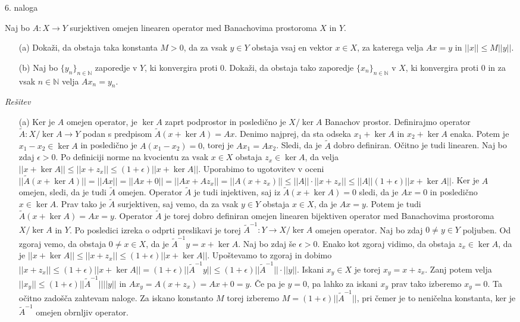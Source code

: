 \documentclass[a4paper, 12pt]{article}
\newcommand{\N}{\mathbb{N}}
\begin{document}
\begin{flushleft}
6. naloga
\end{flushleft}
Naj bo $A:X\rightarrow Y$ surjektiven omejen linearen operator med Banachovima prostoroma $X$ in $Y$.
\begin{enumerate}	
\item[(a)] Dokaži, da obstaja taka konstanta $M> 0$, da za vsak $y\in Y$ obstaja vsaj en vektor $x\in X$, za katerega velja $Ax = y$ in $||x|| \le M ||y||$.
\item[(b)] Naj bo $\{y_n\}_{n\in \N}$ zaporedje v $Y$, ki konvergira proti 0. Dokaži, da obstaja tako zaporedje $\{x_n\}_{n\in \N}$ v $X$, ki konvergira proti 0 in za vsak $n\in \N$ velja $Ax_n = y_n$.
\end{enumerate}
\emph{Rešitev}
\begin{enumerate}
\item[(a)]Ker je $A$ omejen operator, je $\ker A$ zaprt podprostor in posledično je $X/\ker A$ Banachov prostor. Definirajmo operator $\tilde{A}: X/\ker A \rightarrow Y$ podan s predpisom $\tilde{A}(x+\ker A) = Ax$. Denimo najprej, da sta odseka $x_1 + \ker A$ in $x_2 + \ker A$ enaka. Potem je $x_1 - x_2 \in \ker A$ in posledično je $A(x_1 - x_2)=0 $, torej je $Ax_1 = Ax_2$. Sledi, da je $\tilde{A}$ dobro definiran. Očitno je tudi linearen. Naj bo zdaj $\epsilon > 0$. Po definiciji norme na kvocientu za vsak $x \in X$ obstaja $z_x \in \ker A$, da velja $||x+\ker A|| \le ||x+z_x|| \le (1+\epsilon)|| x+\ker A||$. Uporabimo to ugotovitev v oceni $||\tilde{A}(x+\ker A)|| = ||Ax|| = ||Ax + 0|| = ||Ax + Az_x|| = ||A(x+z_x)|| \le ||A|| \cdot ||x+z_x|| \le ||A||(1+\epsilon)||x+\ker A||$. Ker je $A$ omejen, sledi, da je tudi $\tilde{A}$ omejen. Operator $\tilde{A}$ je tudi injektiven, saj iz $\tilde{A}(x+\ker A) = 0$ sledi, da je $Ax=0$ in posledično $x\in \ker A$. Prav tako je $\tilde{A}$ surjektiven, saj vemo, da za vsak $y\in Y$ obstaja $x\in X$, da je $Ax=y$. Potem je tudi $\tilde{A}(x+\ker A) = Ax = y$.
Operator $\tilde{A}$ je torej dobro definiran omejen linearen bijektiven operator med Banachovima prostoroma $X/\ker A$ in $Y$. Po posledici izreka o odprti preslikavi je torej $\tilde{A}^{-1} : Y\rightarrow X/\ker A$ omejen operator.
Naj bo zdaj $0\neq y\in Y$ poljuben. Od zgoraj vemo, da obstaja $0\neq x\in X$, da je $\tilde{A}^{-1} y = x+ \ker A$.
Naj bo zdaj še $\epsilon >0$. Enako kot zgoraj vidimo, da obstaja $z_x \in \ker A$, da je $||x+\ker A|| \le ||x+z_x|| \le (1+\epsilon)||x+\ker A||$. Upoštevamo to zgoraj in dobimo $||x+z_x|| \le (1+\epsilon) ||x+\ker A|| = (1+\epsilon) ||\tilde{A}^{-1}y|| \le (1+\epsilon) ||	\tilde{A}^{-1}|| \cdot ||y||$. Iskani $x_y\in X$ je torej $x_y = x+z_x$. Zanj potem velja $||x_y|| \le (1+\epsilon)||\tilde{A}^{-1}|| ||y||$ in $Ax_y = A(x+z_x) = Ax + 0 = y$. Če pa je $y=0$, pa lahko za iskani $x_y$ prav tako izberemo $x_y = 0$. Ta očitno zadošča zahtevam naloge.  Za iskano konstanto $M$ torej izberemo $M = (1+\epsilon)||\tilde{A}^{-1}||$, pri čemer je to neničelna konstanta, ker je $\tilde{A}^{-1}$ omejen obrnljiv operator.


\end{enumerate}
\end{document}
